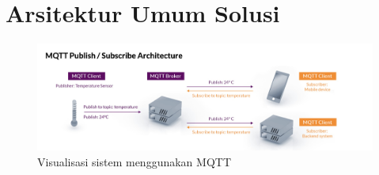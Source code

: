 \chapter{Arsitektur Umum Solusi}
\label{appendix:gambaran-umum-solusi}

\begin{figure}[ht]
  \centering
  \includegraphics[width=1\textwidth]{resources/appendix/arsitektur-mqtt.jpg}
  \caption{Visualisasi sistem menggunakan MQTT \parencite{mqtt}}
  \label{fig:mqtt-architecture-image}
\end{figure}

